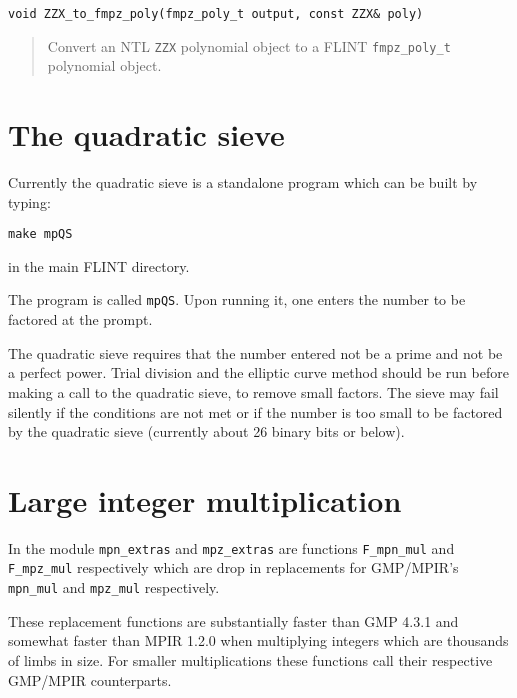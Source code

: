 \documentclass[a4paper,10pt]{article}
\newcommand{\code}{\lstinline}
\begin{document}
\begin{lstlisting}
void ZZX_to_fmpz_poly(fmpz_poly_t output, const ZZX& poly)
\end{lstlisting}
\begin{quote}
Convert an NTL \code{ZZX} polynomial object to a FLINT \code{fmpz_poly_t} polynomial object.
\end{quote}

\section{The quadratic sieve}
Currently the quadratic sieve is a standalone program which can be built by typing:

\code{make mpQS}

in the main FLINT directory.

The program is called \code{mpQS}. Upon running it, one enters the number to be factored at the prompt. 

The quadratic sieve requires that the number entered not be a prime and not be a perfect power. Trial division and the elliptic curve method should be run before making a call to the quadratic sieve, to remove small factors. The sieve may fail silently if the conditions are not met or if the number is too small to be factored by the quadratic sieve (currently about 26 binary bits or below).

\section{Large integer multiplication}
In the module \code{mpn_extras} and \code{mpz_extras} are functions \code{F_mpn_mul} and \code{F_mpz_mul} respectively which are drop in replacements for GMP/MPIR's \code{mpn_mul} and \code{mpz_mul} respectively. 

These replacement functions are substantially faster than GMP 4.3.1 and somewhat faster than MPIR 1.2.0 when multiplying integers which are thousands of limbs in size. For smaller multiplications these functions call their respective GMP/MPIR counterparts.



\end{document}
